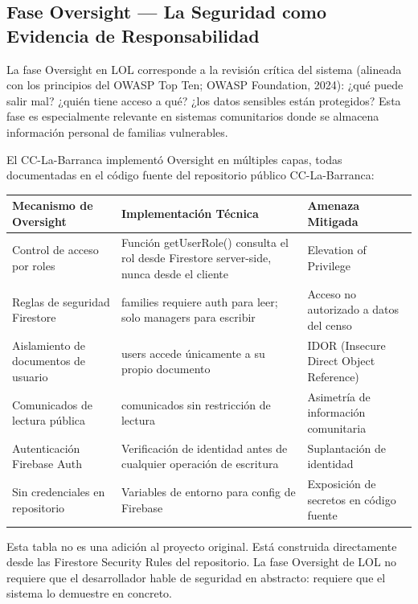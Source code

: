 \documentclass[14pt,a4paper,oneside]{extbook}
\begin{document}
\subsection{Fase Oversight — La Seguridad como Evidencia de Responsabilidad}

La fase Oversight en LOL corresponde a la revisión crítica del sistema (alineada con los principios del OWASP Top Ten; OWASP Foundation, 2024): ¿qué puede salir mal? ¿quién tiene acceso a qué? ¿los datos sensibles están protegidos? Esta fase es especialmente relevante en sistemas comunitarios donde se almacena información personal de familias vulnerables.

El CC-La-Barranca implementó Oversight en múltiples capas, todas documentadas en el código fuente del repositorio público CC-La-Barranca:



\begin{table}[htbp]
\centering
\begin{tabular}{p{} p{} p{}}
\toprule
\textbf{Mecanismo de Oversight} & \textbf{Implementación Técnica} & \textbf{Amenaza Mitigada} \\
\midrule
Control de acceso por roles & Función getUserRole() consulta el rol desde Firestore server-side, nunca desde el cliente & Elevation of Privilege \\
Reglas de seguridad Firestore & families requiere auth para leer; solo managers para escribir & Acceso no autorizado a datos del censo \\
Aislamiento de documentos de usuario & users accede únicamente a su propio documento & IDOR (Insecure Direct Object Reference) \\
Comunicados de lectura pública & comunicados sin restricción de lectura & Asimetría de información comunitaria \\
Autenticación Firebase Auth & Verificación de identidad antes de cualquier operación de escritura & Suplantación de identidad \\
Sin credenciales en repositorio & Variables de entorno para config de Firebase & Exposición de secretos en código fuente \\
\bottomrule
\end{tabular}
\end{table}



Esta tabla no es una adición al proyecto original. Está construida directamente desde las Firestore Security Rules del repositorio. La fase Oversight de LOL no requiere que el desarrollador hable de seguridad en abstracto: requiere que el sistema lo demuestre en concreto.
\end{document}
